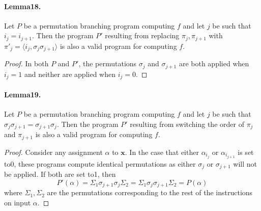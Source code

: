 \paragraph{Lemma18.} Let $P$ be a permutation branching program computing $f$ and let $j$ be such that $i_j=i_{j+1}$. Then the program $P'$ resulting from replacing $\pi_j,\pi_{j+1}$ with $\pi'_j=\langle i_j,\sigma_j\sigma_{j+1}\rangle$ is also a valid program for computing $f$.
\begin{proof}
In both $P$ and $P'$, the permutations $\sigma_j$ and $\sigma_{j+1}$ are both applied when $i_j=1$ and neither are applied when $i_j=0$.
\end{proof}
\paragraph{Lemma19.} Let $P$ be a permutation branching program computing $f$ and let $j$ be such that $\sigma_j\sigma_{j+1}=\sigma_{j+1}\sigma_j$. Then the program $P'$ resulting from switching the order of $\pi_j$ and $\pi_{j+1}$ is also a valid program for computing $f$.
\begin{proof}
Consider any assignment $\alpha$ to $\mathbf x$. In the case that either $\alpha_{i_j}$ or $\alpha_{i_{j+1}}$ is set to0, these programs compute identical permutations as either $\sigma_j$ or $\sigma_{j+1}$ will not be applied. If both are set to1, then
\[P'(\alpha)=\Sigma_1\sigma_{j+1}\sigma_j\Sigma_2=\Sigma_1\sigma_j\sigma_{j+1}\Sigma_2=P(\alpha)\]
where $\Sigma_1,\Sigma_2$ are the permutations corresponding to the rest of the instructions on input $\alpha$.
\end{proof}
